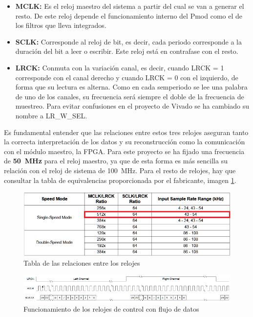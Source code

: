 \begin{itemize}
\item \textbf{MCLK:} Es el reloj maestro del sistema a partir del cual se van a generar el resto. De este reloj depende el funcionamiento interno del Pmod como el de los filtros que lleva integrados.
\item \textbf{SCLK:} Corresponde al reloj de bit, es decir, cada periodo corresponde a la duración del bit a leer o escribir. Este reloj está en contrafase con el resto.
\item \textbf{LRCK:} Conmuta con la variación canal, es decir, cuando LRCK = 1 corresponde con el canal derecho y cuando LRCK = 0 con el izquierdo, de forma que su lectura es alterna. Como en cada semperiodo se lee una palabra de uno de los canales, su frecuencia será siempre el doble de la frecuencia de muestreo. Para evitar confusiones en el proyecto de Vivado se ha cambiado su nombre a LR\_W\_SEL.
\end{itemize}


Es fundamental entender que las relaciones entre estos tres relojes aseguran tanto la correcta interpretación de los datos y su reconstrucción como la comunicación con el módulo maestro, la FPGA. Para este proyecto se ha fijado una frecuencia de \textbf{50~MHz} para el reloj maestro, ya que de esta forma es más sencilla su relación con el reloj de sistema de 100~MHz. Para el resto de relojes, hay que consultar la tabla de equivalencias proporcionada por el fabricante, imagen \ref{fig:flujoreloj}.

\begin{figure}[!b]
\begin{center}
\includegraphics[width=15cm]{img/ratiosreloj.png}
\caption{\label{fig:flujoreloj}Tabla de las relaciones entre los relojes}
\end{center}
\end{figure}

\begin{figure}[!b]
\begin{center}
\includegraphics[width=14cm]{img/i2sov.png}
\caption{\label{fig:i2sov}Funcionamiento de los relojes de control con flujo de datos}
\end{center}
\end{figure}

